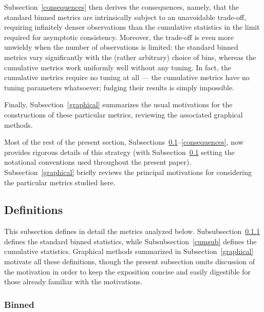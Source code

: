 \documentclass{article}
\begin{document}
Subsection~\ref{consequences} then derives the consequences, namely,
that the standard binned metrics are intrinsically subject
to an unavoidable trade-off, requiring infinitely denser observations
than the cumulative statistics in the limit required
for asymptotic consistency. 
Moreover, the trade-off is even more unwieldy when the number of observations
is limited: the standard binned metrics vary significantly
with the (rather arbitrary) choice of bins, whereas the cumulative metrics
work uniformly well without any tuning.
In fact, the cumulative metrics require no tuning at all ---
the cumulative metrics have no tuning parameters whatsoever;
fudging their results is simply impossible.

Finally, Subsection~\ref{graphical} summarizes the usual motivations
for the constructions of these particular metrics,
reviewing the associated graphical methods.

Most of the rest of the present section,
Subsections~\ref{defsub}--\ref{consequences},
now provides rigorous details of this strategy
(with Subsection~\ref{defsub} setting the notational conventions
used throughout the present paper).
Subsection~\ref{graphical} briefly reviews the principal motivations
for considering the particular metrics studied here.


\subsection{Definitions}
\label{defsub}

This subsection defines in detail the metrics analyzed below.
Subsubsection~\ref{binnedsub} defines the standard binned statistics,
while Subsubsection~\ref{cumsub} defines the cumulative statistics.
Graphical methods summarized in Subsection~\ref{graphical} motivate
all these definitions, though the present subsection omits discussion
of the motivation in order to keep the exposition concise and easily digestible
for those already familiar with the motivations.

\subsubsection{Binned}
\label{binnedsub}
\end{document}
